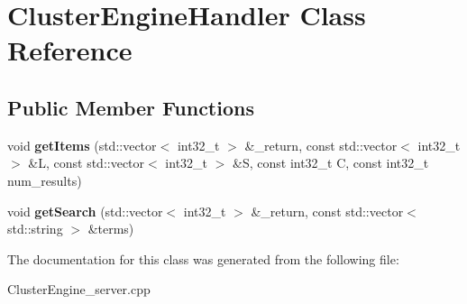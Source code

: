 \hypertarget{classClusterEngineHandler}{
\section{ClusterEngineHandler Class Reference}
\label{classClusterEngineHandler}
}
\subsection*{Public Member Functions}
\begin{DoxyCompactItemize}
\item 
\hypertarget{classClusterEngineHandler_a9c5ccafe88c02803638a286e01306f04}{
void {\bfseries getItems} (std::vector$<$ int32\_\-t $>$ \&\_\-return, const std::vector$<$ int32\_\-t $>$ \&L, const std::vector$<$ int32\_\-t $>$ \&S, const int32\_\-t C, const int32\_\-t num\_\-results)}
\label{classClusterEngineHandler_a9c5ccafe88c02803638a286e01306f04}

\item 
\hypertarget{classClusterEngineHandler_a5d5f586e0cc97ffda27690313e3935f4}{
void {\bfseries getSearch} (std::vector$<$ int32\_\-t $>$ \&\_\-return, const std::vector$<$ std::string $>$ \&terms)}
\label{classClusterEngineHandler_a5d5f586e0cc97ffda27690313e3935f4}

\end{DoxyCompactItemize}


The documentation for this class was generated from the following file:\begin{DoxyCompactItemize}
\item 
ClusterEngine\_\-server.cpp\end{DoxyCompactItemize}
